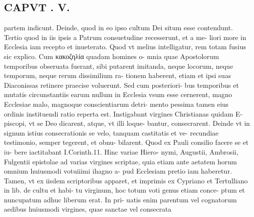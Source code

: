 \documentclass{article}
\begin{document}
\begin{pages}
\section*{CAPVT . V. }
\marginpar{[ p.291 ]}\pstart partem indicunt. Deinde, quod in eo ipso cultum Dei situm esse contendunt. Tertio quod in iis ipsis a Patrum consuetudine recesserunt, et a me- liori more in Ecclesia iam recepto et inueterato. Quod vt melius intelligatur, rem totam fusius sic explico. Cum κακοζηλία quadam homines o- mnia quae Apostolorum temporibus obseruata fuerant, sibi putarent imitanda, neque locorum, neque temporum, neque rerum dissimilium ra- tionem haberent, etiam et ipsi suas Diaconissas retinere praecise voluerunt. Sed cum posteriori- bus temporibus et mutatis circunstantiis earum nullum in Ecclesia vsum esse cernerent, magno Ecclesiae malo, magnoque conscientiarum detri- mento pessima tamen eius ordinis instituendi ratio reperta est. Instigabant virgines Christianas quidam E- piscopi, vt se Deo dicarent, atque, vt illi loque- bantur, consecrarent. Deinde vt in signum istius consecrationis se velo, tanquam castitatis et ve- recundiae testimonio, semper tegerent, et obnu- bilarent. Quod ex Pauli consilio facere se et iu- bere iactitabant I.Corinth.11. Hinc variae Hiero- nymi, Augustii, Ambrosii, Fulgentii epistolae ad varias virgines scriptae, quia etiam ante aetatem horum omnium huiusmodi votuiiimi ihagno a- pud Ecclesiam pretio iam haberetur. Tamen, vt ex iisdem scriptoribus apparet, et imprimis ex Cypriano et Tertulliano in lib.  de cultu et habi- tu virginum, hoc totum voti genus etiam conce- ptum et nuncupatum adhuc liberum erat. In pri- uatis enim parentum vel cognatorum aedibus huiusmodi virgines, quae sanctae vel consecrata  \pend

\end{pages}
\end{document}
